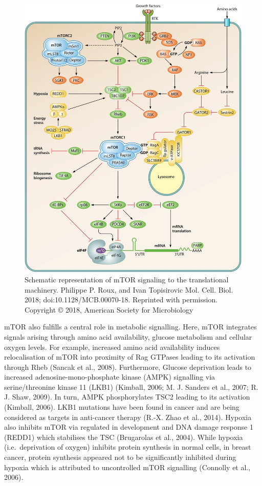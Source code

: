 \documentclass[12pt,openany]{book}
\begin{document}
\begin{figure}[ht]
 \centering
  \includegraphics{./figures/mTORsignal.jpg}
  \caption{Schematic representation of mTOR signaling to the translational machinery. Philippe P. Roux, and Ivan Topisirovic Mol. Cell. Biol. 2018; doi:10.1128/MCB.00070-18. Reprinted with permission. Copyright © 2018, American Society for Microbiology
 \label{fig:mtorsignal}}
\end{figure}

mTOR also fulfills a central role in metabolic signalling. Here, mTOR
integrates signals arising through amino acid availability, glucose
metabolism and cellular oxygen levels. For example, increased amino acid
availability induces relocalisation of mTOR into proximity of Rag
GTPases leading to its activation through Rheb (Sancak et al., 2008).
Furthermore, Glucose deprivation leads to increased
adenosine-mono-phosphate kinase (AMPK) signalling via serine/threonine
kinase 11 (LKB1) (Kimball, 2006; M. J. Sanders et al., 2007; R. J. Shaw,
2009). In turn, AMPK phosphorylates TSC2 leading to its activation
(Kimball, 2006). LKB1 mutations have been found in cancer and are being
considered as targets in anti-cancer therapy (R.-X. Zhao et al., 2014).
Hypoxia also inhibits mTOR via regulated in development and DNA damage
response 1 (REDD1) which stabilises the TSC (Brugarolas et al., 2004).
While hypoxia (i.e.~deprivation of oxygen) inhibits protein synthesis in
normal cells, in breast cancer, protein synthesis appeared not to be
significantly inhibited during hypoxia which is attributed to
uncontrolled mTOR signalling (Connolly et al., 2006).
\end{document}
